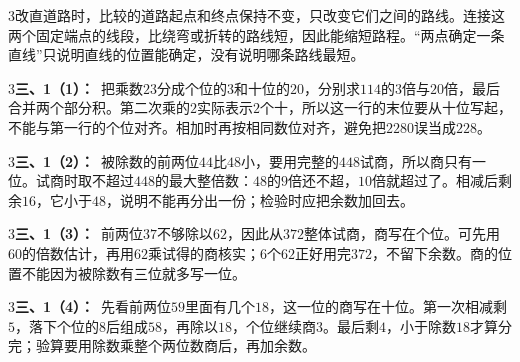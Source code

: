 \documentclass[multi=snippet,border={5bp 20bp 5bp 5bp}]{standalone}
\newenvironment{snippet}[3]{\begin{minipage}{#1bp}\color{answerred}\fontsize{#2}{#3}\selectfont\raggedright}{\end{minipage}}
\begin{document}
\begin{snippet}{505}{11.5}{14}\begin{multicols}{3}\raggedcolumns 改直道路时，比较的道路起点和终点保持不变，只改变它们之间的路线。连接这两个固定端点的线段，比绕弯或折转的路线短，因此能缩短路程。“两点确定一条直线”只说明直线的位置能确定，没有说明哪条路线最短。\end{multicols}\end{snippet}
\begin{snippet}{505}{11.5}{14}\begin{multicols}{3}\raggedcolumns \textbf{三、1（1）：}\ 把乘数\(23\)\allowbreak 分成个位的\(3\)\allowbreak 和十位的\(20\)\allowbreak ，分别求\(114\)\allowbreak 的\(3\)\allowbreak 倍与\(20\)\allowbreak 倍，最后合并两个部分积。第二次乘的\(2\)\allowbreak 实际表示\(2\)\allowbreak 个十，所以这一行的末位要从十位写起，不能与第一行的个位对齐。相加时再按相同数位对齐，避免把\(2280\)\allowbreak 误当成\(228\)\allowbreak 。\end{multicols}\end{snippet}
\begin{snippet}{505}{11.5}{14}\begin{multicols}{3}\raggedcolumns \textbf{三、1（2）：}\ 被除数的前两位\(44\)\allowbreak 比\(48\)\allowbreak 小，要用完整的\(448\)\allowbreak 试商，所以商只有一位。试商时取不超过\(448\)\allowbreak 的最大整倍数：\(48\)\allowbreak 的\(9\)\allowbreak 倍还不超，\(10\)\allowbreak 倍就超过了。相减后剩余\(16\)\allowbreak ，它小于\(48\)\allowbreak ，说明不能再分出一份；检验时应把余数加回去。\end{multicols}\end{snippet}
\begin{snippet}{505}{11.5}{14}\begin{multicols}{3}\raggedcolumns \textbf{三、1（3）：}\ 前两位\(37\)\allowbreak 不够除以\(62\)\allowbreak ，因此从\(372\)\allowbreak 整体试商，商写在个位。可先用\(60\)\allowbreak 的倍数估计，再用\(62\)\allowbreak 乘试得的商核实；\(6\)\allowbreak 个\(62\)\allowbreak 正好用完\(372\)\allowbreak ，不留下余数。商的位置不能因为被除数有三位就多写一位。\end{multicols}\end{snippet}
\begin{snippet}{505}{11.5}{14}\begin{multicols}{3}\raggedcolumns \textbf{三、1（4）：}\ 先看前两位\(59\)\allowbreak 里面有几个\(18\)\allowbreak ，这一位的商写在十位。第一次相减剩\(5\)\allowbreak ，落下个位的\(8\)\allowbreak 后组成\(58\)\allowbreak ，再除以\(18\)\allowbreak ，个位继续商\(3\)\allowbreak 。最后剩\(4\)\allowbreak ，小于除数\(18\)\allowbreak 才算分完；验算要用除数乘整个两位数商后，再加余数。\end{multicols}\end{snippet}
\end{document}
